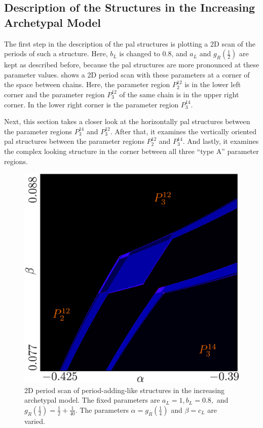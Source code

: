 \subsection{Description of the Structures in the Increasing Archetypal Model}
\label{sec:add.add.like}

The first step in the description of the \gls{pal} structures is plotting a 2D scan of the periods of such a structure.
Here, $b_L$ is changed to $0.8$, and $a_L$ and $g_R\left(\frac{1}{2}\right)$ are kept as described before, because the \gls{pal} structures are more pronounced at these parameter values.
 shows a 2D period scan with these parameters at a corner of the space between chains.
Here, the parameter region $P^{12}_2$ is in the lower left corner and the parameter region $P^{12}_3$ of the same chain is in the upper right corner.
In the lower right corner is the parameter region $P^{14}_3$.

Next, this section takes a closer look at the horizontally \gls{pal} structures between the parameter regions $P^{14}_3$ and $P^{12}_3$.
After that, it examines the vertically oriented \gls{pal} structures between the parameter regions $P^{12}_2$ and $P^{14}_3$.
And lastly, it examines the complex looking structure in the corner between all three ``type A'' parameter regions.

\begin{figure}
	\centering
	\includegraphics[width=.7 \textwidth]{../Figures/7/7.11/result.png}
	\caption[2D period scan of period-adding-like structures in the increasing archetypal model]{
		2D period scan of period-adding-like structures in the increasing archetypal model.
		The fixed parameters are $a_L = 1, b_L = 0.8,$ and $g_R\left(\frac{1}{2}\right) = \frac{1}{2} + \frac{1}{40}$.
		The parameters $\alpha = g_R\left(\frac{1}{4}\right)$ and $\beta = c_L$ are varied.
	}
	\label{fig:add.add.like}
\end{figure}

